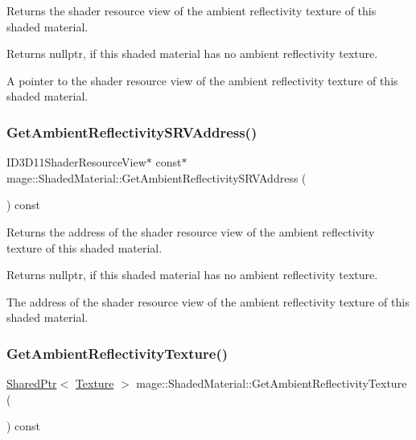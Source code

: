 Returns the shader resource view of the ambient reflectivity texture of this shaded material.

\begin{DoxyReturn}{Returns}
{\ttfamily nullptr}, if this shaded material has no ambient reflectivity texture. 

A pointer to the shader resource view of the ambient reflectivity texture of this shaded material. 
\end{DoxyReturn}
\hypertarget{structmage_1_1_shaded_material_a854b166ed33ab748910d98a0ea6bd4d1}{}\label{structmage_1_1_shaded_material_a854b166ed33ab748910d98a0ea6bd4d1} 
\subsubsection{\texorpdfstring{Get\+Ambient\+Reflectivity\+S\+R\+V\+Address()}{GetAmbientReflectivitySRVAddress()}}
{\footnotesize\ttfamily I\+D3\+D11\+Shader\+Resource\+View$\ast$ const$\ast$ mage\+::\+Shaded\+Material\+::\+Get\+Ambient\+Reflectivity\+S\+R\+V\+Address (\begin{DoxyParamCaption}{ }\end{DoxyParamCaption}) const\hspace{0.3cm}{\ttfamily [noexcept]}}

Returns the address of the shader resource view of the ambient reflectivity texture of this shaded material.

\begin{DoxyReturn}{Returns}
{\ttfamily nullptr}, if this shaded material has no ambient reflectivity texture. 

The address of the shader resource view of the ambient reflectivity texture of this shaded material. 
\end{DoxyReturn}
\hypertarget{structmage_1_1_shaded_material_a66be8b4fbb028b41483f8a9e044e5023}{}\label{structmage_1_1_shaded_material_a66be8b4fbb028b41483f8a9e044e5023} 
\subsubsection{\texorpdfstring{Get\+Ambient\+Reflectivity\+Texture()}{GetAmbientReflectivityTexture()}}
{\footnotesize\ttfamily \hyperlink{namespacemage_a1e01ae66713838a7a67d30e44c67703e}{Shared\+Ptr}$<$ \hyperlink{classmage_1_1_texture}{Texture} $>$ mage\+::\+Shaded\+Material\+::\+Get\+Ambient\+Reflectivity\+Texture (\begin{DoxyParamCaption}{ }\end{DoxyParamCaption}) const\hspace{0.3cm}{\ttfamily [noexcept]}}

